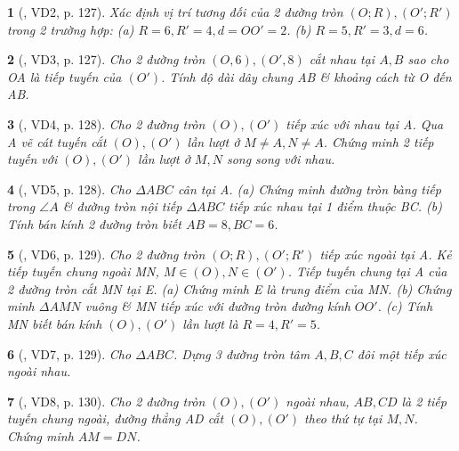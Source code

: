 \documentclass{article}
\newtheorem{baitoan}{}
\begin{document}
\begin{baitoan}[\cite{Binh_boi_duong_Toan_9_tap_1}, VD2, p. 127]
	Xác định vị trí tương đối của 2 đường tròn $(O;R),(O';R')$ trong 2 trường hợp: (a) $R = 6,R' = 4,d = OO' = 2$. (b) $R = 5,R' = 3,d = 6$.
\end{baitoan}

\begin{baitoan}[\cite{Binh_boi_duong_Toan_9_tap_1}, VD3, p. 127]
	Cho 2 đường tròn $(O,6),(O',8)$ cắt nhau tại $A,B$ sao cho OA là tiếp tuyến của $(O')$. Tính độ dài dây chung AB \& khoảng cách từ O đến AB.
\end{baitoan}

\begin{baitoan}[\cite{Binh_boi_duong_Toan_9_tap_1}, VD4, p. 128]
	 Cho 2 đường tròn $(O),(O')$ tiếp xúc với nhau tại A. Qua A vẽ cát tuyến cắt $(O),(O')$ lần lượt ở $M\ne A,N\ne A$. Chứng minh 2 tiếp tuyến với $(O),(O')$ lần lượt ở $M,N$ song song với nhau.
\end{baitoan}

\begin{baitoan}[\cite{Binh_boi_duong_Toan_9_tap_1}, VD5, p. 128]
	Cho $\Delta ABC$ cân tại A. (a) Chứng minh đường tròn bàng tiếp trong $\angle{A}$ \& đường tròn nội tiếp $\Delta ABC$ tiếp xúc nhau tại 1 điểm thuộc BC. (b) Tính bán kính 2 đường tròn biết $AB = 8,BC = 6$.
\end{baitoan}

\begin{baitoan}[\cite{Binh_boi_duong_Toan_9_tap_1}, VD6, p. 129]
	Cho 2 đường tròn $(O;R),(O';R')$ tiếp xúc ngoài tại A. Kẻ tiếp tuyến chung ngoài MN, $M\in(O),N\in(O')$. Tiếp tuyến chung tại A của 2 đường tròn cắt MN tại E. (a) Chứng minh E là trung điểm của MN. (b) Chứng minh $\Delta AMN$ vuông \& MN tiếp xúc với đường tròn đường kính $OO'$. (c) Tính MN biết bán kính $(O),(O')$ lần lượt là $R = 4,R' = 5$.
\end{baitoan}

\begin{baitoan}[\cite{Binh_boi_duong_Toan_9_tap_1}, VD7, p. 129]
	Cho $\Delta ABC$. Dựng 3 đường tròn tâm $A,B,C$ đôi một tiếp xúc ngoài nhau.
\end{baitoan}

\begin{baitoan}[\cite{Binh_boi_duong_Toan_9_tap_1}, VD8, p. 130]
	Cho 2 đường tròn $(O),(O')$ ngoài nhau, $AB,CD$ là 2 tiếp tuyến chung ngoài, đường thẳng AD cắt $(O),(O')$ theo thứ tự tại $M,N$. Chứng minh $AM = DN$.
\end{baitoan}
\end{document}
